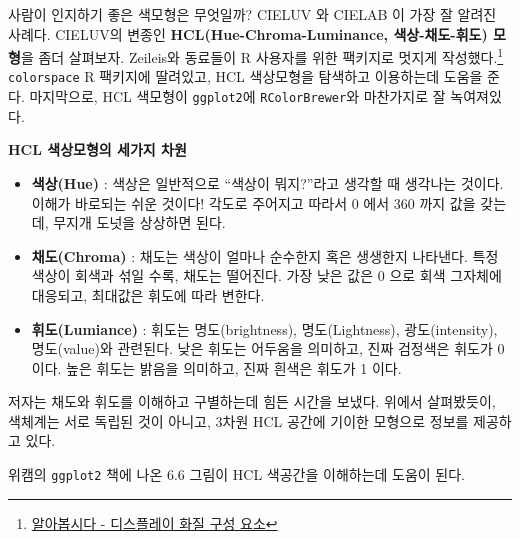 \documentclass[
  letterpaper,
]{book}
\providecommand{\tightlist}{%
  \setlength{\itemsep}{0pt}\setlength{\parskip}{0pt}}\usepackage{longtable,booktabs,array}
\begin{document}
사람이 인지하기 좋은 색모형은 무엇일까? CIELUV 와 CIELAB 이 가장 잘
알려진 사례다. CIELUV의 변종인 \textbf{HCL(Hue-Chroma-Luminance,
색상-채도-휘도) 모형}을 좀더 살펴보자. Zeileis와 동료들이 R 사용자를
위한 팩키지로 멋지게 작성했다.\footnote{\href{http://www.dt.co.kr/contents.html?article_no=2014110702101832742001}{알아봅시다
  - 디스플레이 화질 구성 요소}} \texttt{colorspace} R 팩키지에 딸려있고,
HCL 색상모형을 탐색하고 이용하는데 도움을 준다. 마지막으로, HCL 색모형이
\texttt{ggplot2}에 \texttt{RColorBrewer}와 마찬가지로 잘 녹여져있다.

\textbf{HCL 색상모형의 세가지 차원}

\begin{itemize}
\tightlist
\item
  \textbf{색상(Hue)} : 색상은 일반적으로 ``색상이 뭐지?''라고 생각할 때
  생각나는 것이다. 이해가 바로되는 쉬운 것이다! 각도로 주어지고 따라서 0
  에서 360 까지 값을 갖는데, 무지개 도넛을 상상하면 된다.
\item
  \textbf{채도(Chroma)} : 채도는 색상이 얼마나 순수한지 혹은 생생한지
  나타낸다. 특정 색상이 회색과 섞일 수록, 채도는 떨어진다. 가장 낮은
  값은 0 으로 회색 그자체에 대응되고, 최대값은 휘도에 따라 변한다.
\item
  \textbf{휘도(Lumiance)} : 휘도는 명도(brightness), 명도(Lightness),
  광도(intensity), 명도(value)와 관련된다. 낮은 휘도는 어두움을
  의미하고, 진짜 검정색은 휘도가 0 이다. 높은 휘도는 밝음을 의미하고,
  진짜 흰색은 휘도가 1 이다.
\end{itemize}

저자는 채도와 휘도를 이해하고 구별하는데 힘든 시간을 보냈다. 위에서
살펴봤듯이, 색체계는 서로 독립된 것이 아니고, 3차원 HCL 공간에 기이한
모형으로 정보를 제공하고 있다.

위캠의 \texttt{ggplot2} 책에 나온 6.6 그림이 HCL 색공간을 이해하는데
도움이 된다.
\end{document}
